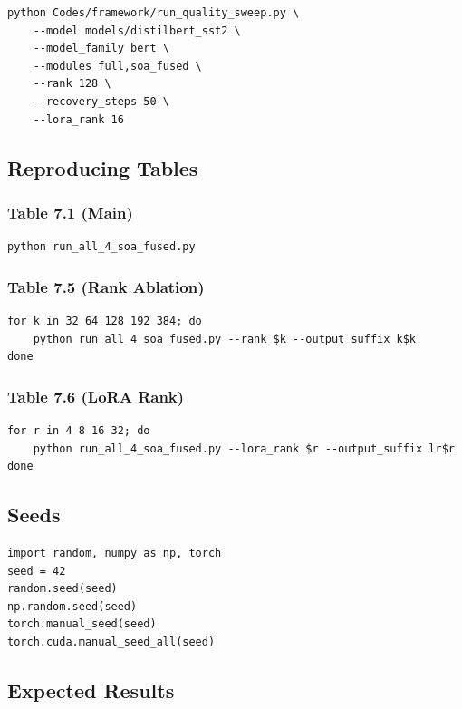\begin{lstlisting}
python Codes/framework/run_quality_sweep.py \
    --model models/distilbert_sst2 \
    --model_family bert \
    --modules full,soa_fused \
    --rank 128 \
    --recovery_steps 50 \
    --lora_rank 16
\end{lstlisting}

\subsection{Reproducing Tables}

\subsubsection{Table 7.1 (Main)}
\begin{lstlisting}
python run_all_4_soa_fused.py
\end{lstlisting}

\subsubsection{Table 7.5 (Rank Ablation)}
\begin{lstlisting}
for k in 32 64 128 192 384; do
    python run_all_4_soa_fused.py --rank $k --output_suffix k$k
done
\end{lstlisting}

\subsubsection{Table 7.6 (LoRA Rank)}
\begin{lstlisting}
for r in 4 8 16 32; do
    python run_all_4_soa_fused.py --lora_rank $r --output_suffix lr$r
done
\end{lstlisting}

\subsection{Seeds}

\begin{lstlisting}
import random, numpy as np, torch
seed = 42
random.seed(seed)
np.random.seed(seed)
torch.manual_seed(seed)
torch.cuda.manual_seed_all(seed)
\end{lstlisting}

\subsection{Expected Results}

